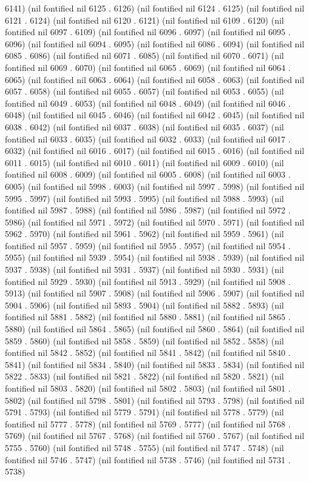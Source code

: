 {6141) (nil fontified nil 6125 . 6126) (nil fontified nil 6124 . 6125) (nil fontified nil 6121 . 6124) (nil fontified nil 6120 . 6121) (nil fontified nil 6109 . 6120) (nil fontified nil 6097 . 6109) (nil fontified nil 6096 . 6097) (nil fontified nil 6095 . 6096) (nil fontified nil 6094 . 6095) (nil fontified nil 6086 . 6094) (nil fontified nil 6085 . 6086) (nil fontified nil 6071 . 6085) (nil fontified nil 6070 . 6071) (nil fontified nil 6069 . 6070) (nil fontified nil 6065 . 6069) (nil fontified nil 6064 . 6065) (nil fontified nil 6063 . 6064) (nil fontified nil 6058 . 6063) (nil fontified nil 6057 . 6058) (nil fontified nil 6055 . 6057) (nil fontified nil 6053 . 6055) (nil fontified nil 6049 . 6053) (nil fontified nil 6048 . 6049) (nil fontified nil 6046 . 6048) (nil fontified nil 6045 . 6046) (nil fontified nil 6042 . 6045) (nil fontified nil 6038 . 6042) (nil fontified nil 6037 . 6038) (nil fontified nil 6035 . 6037) (nil fontified nil 6033 . 6035) (nil fontified nil 6032 . 6033) (nil fontified nil 6017 . 6032) (nil fontified nil 6016 . 6017) (nil fontified nil 6015 . 6016) (nil fontified nil 6011 . 6015) (nil fontified nil 6010 . 6011) (nil fontified nil 6009 . 6010) (nil fontified nil 6008 . 6009) (nil fontified nil 6005 . 6008) (nil fontified nil 6003 . 6005) (nil fontified nil 5998 . 6003) (nil fontified nil 5997 . 5998) (nil fontified nil 5995 . 5997) (nil fontified nil 5993 . 5995) (nil fontified nil 5988 . 5993) (nil fontified nil 5987 . 5988) (nil fontified nil 5986 . 5987) (nil fontified nil 5972 . 5986) (nil fontified nil 5971 . 5972) (nil fontified nil 5970 . 5971) (nil fontified nil 5962 . 5970) (nil fontified nil 5961 . 5962) (nil fontified nil 5959 . 5961) (nil fontified nil 5957 . 5959) (nil fontified nil 5955 . 5957) (nil fontified nil 5954 . 5955) (nil fontified nil 5939 . 5954) (nil fontified nil 5938 . 5939) (nil fontified nil 5937 . 5938) (nil fontified nil 5931 . 5937) (nil fontified nil 5930 . 5931) (nil fontified nil 5929 . 5930) (nil fontified nil 5913 . 5929) (nil fontified nil 5908 . 5913) (nil fontified nil 5907 . 5908) (nil fontified nil 5906 . 5907) (nil fontified nil 5904 . 5906) (nil fontified nil 5893 . 5904) (nil fontified nil 5882 . 5893) (nil fontified nil 5881 . 5882) (nil fontified nil 5880 . 5881) (nil fontified nil 5865 . 5880) (nil fontified nil 5864 . 5865) (nil fontified nil 5860 . 5864) (nil fontified nil 5859 . 5860) (nil fontified nil 5858 . 5859) (nil fontified nil 5852 . 5858) (nil fontified nil 5842 . 5852) (nil fontified nil 5841 . 5842) (nil fontified nil 5840 . 5841) (nil fontified nil 5834 . 5840) (nil fontified nil 5833 . 5834) (nil fontified nil 5822 . 5833) (nil fontified nil 5821 . 5822) (nil fontified nil 5820 . 5821) (nil fontified nil 5803 . 5820) (nil fontified nil 5802 . 5803) (nil fontified nil 5801 . 5802) (nil fontified nil 5798 . 5801) (nil fontified nil 5793 . 5798) (nil fontified nil 5791 . 5793) (nil fontified nil 5779 . 5791) (nil fontified nil 5778 . 5779) (nil fontified nil 5777 . 5778) (nil fontified nil 5769 . 5777) (nil fontified nil 5768 . 5769) (nil fontified nil 5767 . 5768) (nil fontified nil 5760 . 5767) (nil fontified nil 5755 . 5760) (nil fontified nil 5748 . 5755) (nil fontified nil 5747 . 5748) (nil fontified nil 5746 . 5747) (nil fontified nil 5738 . 5746) (nil fontified nil 5731 . 5738) }
